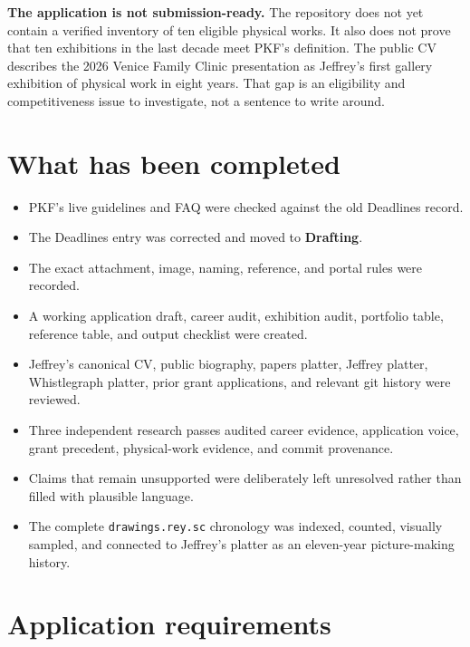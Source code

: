 \documentclass[11pt,letterpaper]{article}
\newcommand{\status}[1]{\textcolor{acpink}{\textbf{#1}}}
\begin{document}
\status{The application is not submission-ready.} The repository does not yet contain a verified inventory of ten eligible physical works. It also does not prove that ten exhibitions in the last decade meet PKF's definition. The public CV describes the 2026 Venice Family Clinic presentation as Jeffrey's first gallery exhibition of physical work in eight years. That gap is an eligibility and competitiveness issue to investigate, not a sentence to write around.

\section{What has been completed}

\begin{itemize}
\item PKF's live guidelines and FAQ were checked against the old Deadlines record.
\item The Deadlines entry was corrected and moved to \textbf{Drafting}.
\item The exact attachment, image, naming, reference, and portal rules were recorded.
\item A working application draft, career audit, exhibition audit, portfolio table, reference table, and output checklist were created.
\item Jeffrey's canonical CV, public biography, papers platter, Jeffrey platter, Whistlegraph platter, prior grant applications, and relevant git history were reviewed.
\item Three independent research passes audited career evidence, application voice, grant precedent, physical-work evidence, and commit provenance.
\item Claims that remain unsupported were deliberately left unresolved rather than filled with plausible language.
\item The complete \texttt{drawings.rey.sc} chronology was indexed, counted, visually sampled, and connected to Jeffrey's platter as an eleven-year picture-making history.
\end{itemize}

\section{Application requirements}
\end{document}

